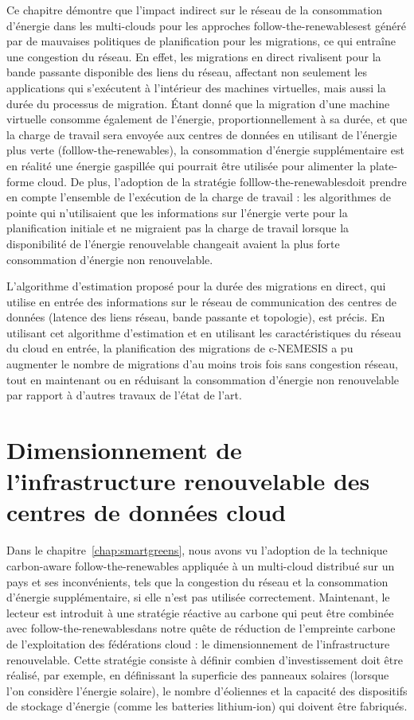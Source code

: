 Ce chapitre démontre que l'impact indirect sur le réseau de la consommation d'énergie dans les multi-clouds pour les approches \guillemotleft follow-the-renewables\guillemotright est généré par de mauvaises politiques de planification pour les migrations, ce qui entraîne une congestion du réseau. En effet, les migrations en direct rivalisent pour la bande passante disponible des liens du réseau, affectant non seulement les applications qui s'exécutent à l'intérieur des machines virtuelles, mais aussi la durée du processus de migration. Étant donné que la migration d'une machine virtuelle consomme également de l'énergie, proportionnellement à sa durée, et que la charge de travail sera envoyée aux centres de données en utilisant de l'énergie plus verte (\guillemotleft folllow-the-renewables\guillemotright), la consommation d'énergie supplémentaire est en réalité une énergie gaspillée qui pourrait être utilisée pour alimenter la plate-forme cloud. De plus, l'adoption de la stratégie \guillemotleft folllow-the-renewables\guillemotright doit prendre en compte l'ensemble de l'exécution de la charge de travail : les algorithmes de pointe qui n'utilisaient que les informations sur l'énergie verte pour la planification initiale et ne migraient pas la charge de travail lorsque la disponibilité de l'énergie renouvelable changeait avaient la plus forte consommation d'énergie non renouvelable.


L'algorithme d'estimation proposé pour la durée des migrations en direct, qui utilise en entrée des informations sur le réseau de communication des centres de données (latence des liens réseau, bande passante et topologie), est précis. En utilisant cet algorithme d'estimation et en utilisant les caractéristiques du réseau du cloud en entrée, la planification des migrations de c-NEMESIS a pu augmenter le nombre de migrations d'au moins trois fois sans congestion réseau, tout en maintenant ou en réduisant la consommation d'énergie non renouvelable par rapport à d'autres travaux de l'état de l'art.


\section{Dimensionnement de l'infrastructure renouvelable des centres de données cloud}

Dans le chapitre~\ref{chap:smartgreens}, nous avons vu l'adoption de la technique carbon-aware follow-the-renewables appliquée à un multi-cloud distribué sur un pays et ses inconvénients, tels que la congestion du réseau et la consommation d'énergie supplémentaire, si elle n'est pas utilisée correctement. Maintenant, le lecteur est introduit à une stratégie réactive au carbone qui peut être combinée avec \guillemotleft follow-the-renewables\guillemotright dans notre quête de réduction de l'empreinte carbone de l'exploitation des fédérations cloud : le dimensionnement de l'infrastructure renouvelable. Cette stratégie consiste à définir combien d'investissement doit être réalisé, par exemple, en définissant la superficie des panneaux solaires (lorsque l'on considère l'énergie solaire), le nombre d'éoliennes et la capacité des dispositifs de stockage d'énergie (comme les batteries lithium-ion) qui doivent être fabriqués.



